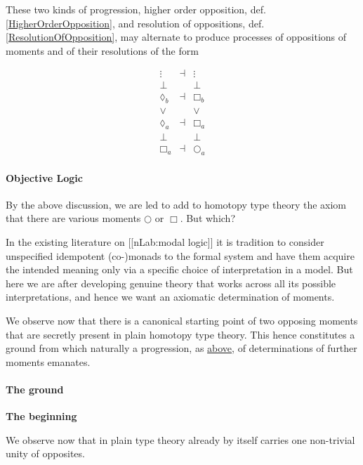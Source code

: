 \documentclass[12pt,titlepage]{article}
\newcommand{\itexarray}[1]{\begin{matrix}#1\end{matrix}}
\theoremstyle{plain}
\theoremstyle{definition}
\theoremstyle{remark}
\begin{document}
These two kinds of progression, higher order opposition, def. \ref{HigherOrderOpposition}, and resolution of oppositions, def. \ref{ResolutionOfOpposition}, may alternate to produce processes of oppositions of moments and of their resolutions of the form

\begin{displaymath}
\itexarray{
     \vdots  &\dashv& \vdots
     \\
     \bot && \bot
     \\
     \lozenge_b &\dashv& \Box_b
     \\
     \vee && \vee
     \\
     \lozenge_a &\dashv& \Box_a
     \\
     \bot && \bot
     \\
     \Box_a &\dashv& \bigcirc_a
  }
\end{displaymath}
\hypertarget{ObjectiveLogic}{}\paragraph*{{Objective Logic}}\label{ObjectiveLogic}

By the above discussion, we are led to add to homotopy type theory the axiom that there are various moments $\bigcirc$ or $\Box$. But which?

In the existing literature on [[nLab:modal logic]] it is tradition to consider unspecified idempotent (co-)monads to the formal system and have them acquire the intended meaning only via a specific choice of interpretation in a model. But here we are after developing genuine theory that works across all its possible interpretations, and hence we want an axiomatic determination of moments.

We observe now that there is a canonical starting point of two opposing moments that are secretly present in plain homotopy type theory. This hence constitutes a ground from which naturally a progression, as \hyperlink{Progression}{above}, of determinations of further moments emanates.

\hypertarget{TheGround}{}\paragraph*{{The ground}}\label{TheGround}

\textbf{The beginning}

We observe now that in plain type theory already by itself carries one non-trivial unity of opposites.
\end{document}
